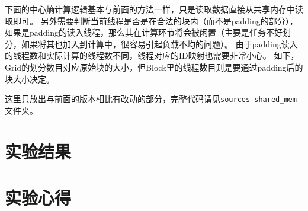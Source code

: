 \documentclass[logo,reportComp]{thesis}
\begin{document}
下面的中心熵计算逻辑基本与前面的方法一样，只是读取数据直接从共享内存中读取即可。
另外需要判断当前线程是否是在合法的块内（而不是padding的部分），如果是padding的读入线程，那么其在计算环节将会被闲置（主要是任务不好划分，如果将其也加入到计算中，很容易引起负载不均的问题）。
由于padding读入的线程数和实际计算的线程数不同，线程对应的ID映射也需要非常小心。
如下，Grid的划分数目对应原始块的大小，但Block里的线程数目则是要通过padding后的块大小决定。


这里只放出与前面的版本相比有改动的部分，完整代码请见\verb'sources-shared_mem'文件夹。


\section{实验结果}
\label{sec:exp}

\section{实验心得}

\end{document}
